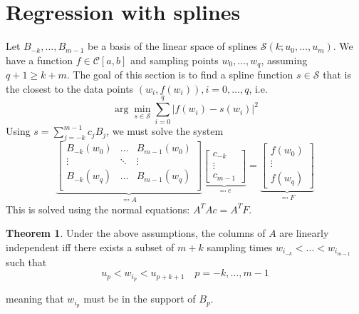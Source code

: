 \documentclass[12pt, openany]{report}
\theoremstyle{definition}
\newtheorem{thm}{Theorem}[chapter]
\begin{document}
\section{Regression with splines}
Let \(B_{-k},\dots,B_{m-1}\) be a basis of the linear space of splines \(\mathcal{S}(k;u_0,\dots,u_m)\). We have a function \(f\in \mathcal{C}[a,b]\) and sampling points \(w_0,\dots,w_q\), assuming \(q+1\ge k+m\). The goal of this section is to find a spline function \(s\in \mathcal{S}\) that is the closest to the data points \((w_i,f(w_i)), i=0,\dots,q\), i.e.
\begin{equation}
    \arg\min_{s\in \mathcal{S}}\sum_{i=0}^q|f(w_i)-s(w_i)|^2
\end{equation}
Using \(s=\sum_{j=-k}^{m-1}c_jB_j\), we must solve the system
\begin{equation}
    \underbrace{
    \begin{bmatrix}
        B_{-k}(w_0) & \dots & B_{m-1}(w_0)\\
        \vdots & \ddots & \vdots\\
        B_{-k}(w_q) & \dots & B_{m-1}(w_q)\\
    \end{bmatrix}}_{\eqcolon A}\underbrace{\begin{bmatrix}
        c_{-k}\\ \vdots \\ c_{m-1}
    \end{bmatrix}}_{\eqcolon c} = \underbrace{\begin{bmatrix}
        f(w_0)\\ \vdots\\ f(w_q)
    \end{bmatrix}}_{\eqcolon F}
\end{equation}
This is solved using the normal equations: \(A^TAc=A^TF\). 
\begin{thm}
    Under the above assumptions, the columns of \(A\) are linearly independent iff there exists a subset of \(m+k\) sampling times \(w_{i_{-k}}<\dots<w_{i_{m-1}}\) such that 
    \begin{equation}
        u_p<w_{i_p}<u_{p+k+1}\quad p=-k,\dots,m-1
    \end{equation}
\end{thm}
meaning that \(w_{i_p}\) must be in the support of \(B_p\). 
\end{document}
